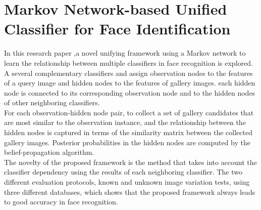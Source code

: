 \section{Markov Network-based Unified Classifier for Face Identification }
In this research paper ,a novel unifying framework using a Markov network to learn the relationship between multiple classifiers in face recognition is explored. \\A  several complementary classifiers and assign observation nodes to the features of a query image and hidden nodes to the features of gallery images. each hidden node is connected to its corresponding observation node and to the hidden nodes of other neighboring classifiers.\\ For each observation-hidden node pair, to  collect a set of gallery candidates that are most similar to the observation instance, and the relationship between the hidden nodes is captured in terms of the similarity matrix between the collected gallery images. Posterior probabilities in the hidden nodes are computed by the belief-propagation algorithm.\\ The novelty of the proposed framework is the method that takes into account the classifier dependency using the results of each neighboring classifier. The  two different evaluation protocols, known and unknown image variation tests, using three different databases, which shows that the proposed framework always leads to good accuracy in face recognition.\\

